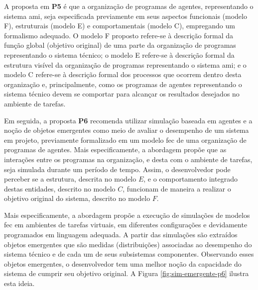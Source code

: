     A proposta em \textbf{P5} é que a organização de programas de agentes, representando o sistema \acrshort{ami}, seja especificada previamente em seus aspectos funcionais (modelo F), estruturais (modelo E) e comportamentais (modelo C), empregando um formalismo adequado. O modelo F proposto refere-se à descrição formal da função global (objetivo original) de uma parte da organização de programas representando o sistema técnico; o modelo E refere-se à descrição formal da estrutura visível da organização de programas representando o sistema \acrshort{ami}; e o modelo C refere-se à descrição formal dos processos que ocorrem dentro desta organização e, principalmente, como os programas de agentes representando o sistema técnico devem se comportar para alcançar os resultados desejados no ambiente de tarefas.
    
    Em seguida, a proposta \textbf{P6} recomenda utilizar simulação baseada em agentes e a noção de objetos emergentes como meio de avaliar o desempenho de um sistema em projeto, previamente formalizado em um modelo \acrshort{fec} de uma organização de programas de agentes. Mais especificamente, a abordagem propõe que as interações entre os programas na organização, e desta com o ambiente de tarefas, seja simulada durante um período de tempo. Assim, o desenvolvedor pode perceber se a estrutura, descrita no modelo $E$, e o comportamento integrado destas entidades, descrito no modelo $C$, funcionam de maneira a realizar o objetivo original do sistema, descrito no modelo $F$.
    
    Mais especificamente, a abordagem propõe a execução de simulações de modelos \acrshort{fec} em ambientes de tarefas virtuais, em diferentes configurações e devidamente programados em linguagem adequada. A partir das simulações são extraídos objetos emergentes que são medidas (distribuições) associadas ao desempenho do sistema técnico e de cada um de seus subsistemas componentes. Observando esses objetos emergentes, o desenvolvedor tem uma melhor noção da capacidade do sistema de cumprir seu objetivo original. A Figura \ref{fig:sim-emergente-p6} ilustra esta ideia.
        
    \begin{figure}[h!]
        \centering
    \end{figure}
    
